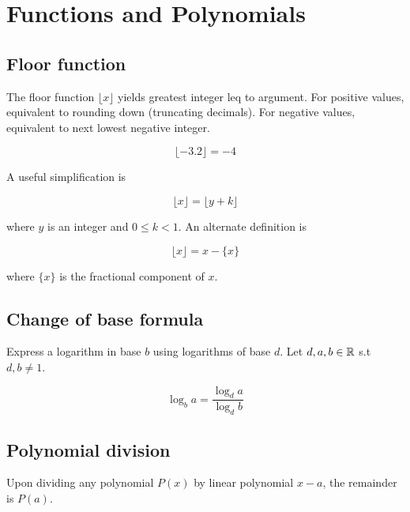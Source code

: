 \section{Functions and Polynomials}

\subsection{Floor function}

The floor function $\lfloor x \rfloor$ yields greatest integer
leq to argument. For positive values, equivalent to rounding down (truncating decimals).
For negative values, equivalent to next lowest negative integer.

\begin{example}
    $$\lfloor -3.2 \rfloor = -4$$
\end{example}

A useful simplification is

\begin{equation}
    \lfloor x \rfloor = \lfloor y+k \rfloor
\end{equation}

where $y$ is an integer and $0 \leq k < 1$. An alternate definition
is

\begin{equation}
    \lfloor x \rfloor = x - \{x\}
\end{equation}

where $\{x\}$ is the fractional component of $x$.

\subsection{Change of base formula}

Express a logarithm in base $b$ using logarithms of base $d$.
Let $d,a,b\in \mathbb{R}$ s.t $d,b\neq 1$.

\begin{equation}
    \log _{b} a=\frac{\log _{d} a}{\log _{d} b}
\end{equation}

\subsection{Polynomial division}

\begin{definition}
    Upon dividing any polynomial $P(x)$ by linear polynomial $x-a$, the remainder is $P(a)$.
\end{definition} 

